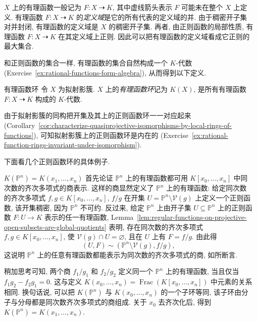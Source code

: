 $X$ 上的有理函数一般记为 $F:X\mathrel{\rightdasharrow} K$, 其中虚线箭头表示 $F$ 可能未在整个 $X$ 上定义. 有理函数 $F:X\mathrel{\rightdasharrow} K$ 的\emph{定义域}是它的所有代表的定义域的并. 由于稠密开子集对并封闭, 有理函数的定义域是 $X$ 的稠密开子集. 再者, 由正则函数的局部性质, 有理函数 $F:X\mathrel{\rightdasharrow} K$ 在其定义域上正则. 因此可以把有理函数的定义域看成它正则的最大集合.

和正则函数的集合一样, 有理函数的集合自然构成一个 $K$-代数 (Exercise~\ref{ex:rational-functions-form-algebra}), 从而得到以下定义.

\begin{Definition}{有理函数环}\leavevmode\label{def:ring-of-rational-functions}
令 $X$ 为拟射影簇. $X$ 上的\emph{有理函数环}记为 $K(X)$, 是所有有理函数 $F:X\mathrel{\rightdasharrow} K$ 构成的 $K$-代数.
\end{Definition}

由于拟射影簇的同构把开集及其上的正则函数环一一对应起来 (Corollary~\ref{cor:characterize-quasiprojective-isomorphisms-by-local-rings-of-functions}), 可知拟射影簇上的正则函数环是内在的 (Exercise~\ref{ex:rational-function-rings-invariant-under-isomorphism}).

下面看几个正则函数环的具体例子.

\begin{Example}{$K(\mathbb{P}^{n})=K(x_{1},\ldots,x_{n})$}\leavevmode\label{ex:rational-function-field-of-projective-space}
首先论证 $\mathbb{P}^{n}$ 上的有理函数都可用 $K[x_{0},\ldots,x_{n}]$ 中同次数的齐次多项式的商表示. 这样的商显然定义了 $\mathbb{P}^{n}$ 上的有理函数: 给定同次数的齐次多项式 $f,g\in K[x_{0},\ldots,x_{n}]$, $f/g$ 在开集 $U=\mathbb{P}^{n}\setminus\mathcal{V}(g)$ 上定义一个正则函数, 该开集稠密, 因为 $\mathbb{P}^{n}$ 不可约. 反过来, 给定 $\mathbb{P}^{n}$ 上由开子集 $U\subseteq\mathbb{P}^{n}$ 上的正则函数 $F:U\to K$ 表示的任一有理函数, Lemma~\ref{lem:regular-functions-on-projective-open-subsets-are-global-quotients} 表明, 存在同次数的齐次多项式 $f,g\in K[x_{0},\ldots,x_{n}]$, 使 $\mathcal{V}(g)\cap U=\varnothing$, 且在 $U$ 上有 $F=f/g$. 由此得
\[
  (U,F)\sim(\mathbb{P}^{n}\setminus\mathcal{V}(g),f/g),
\]
这说明 $\mathbb{P}^{n}$ 上的任意有理函数都能表示为同次数的齐次多项式的商, 如所断言.

稍加思考可知, 两个商 $f_{1}/g_{1}$ 和 $f_{2}/g_{2}$ 定义同一个 $\mathbb{P}^{n}$ 上的有理函数, 当且仅当 $f_{1}g_{2}-f_{2}g_{1}=0$. 这与定义 $K(x_{0},\ldots,x_{n})=\operatorname{Frac}(K[x_{0},\ldots,x_{n}])$ 中元素的关系相同. 换句话说, 可以把 $K(\mathbb{P}^{n})$ 与 $K(x_{0},\ldots,x_{n})$ 的一个子环等同, 该子环由分子与分母都是同次数齐次多项式的商组成. 关于 $x_{0}$ 去齐次化后, 得到 $K(\mathbb{P}^{n})=K(x_{1},\ldots,x_{n})$.
\end{Example}

